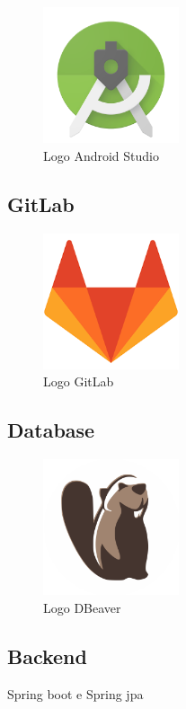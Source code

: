 \begin{figure}[htbp]	
	\centering
	\includegraphics[width=4cm]{immagini/logoandroidstudio.png}
	\caption{Logo Android Studio}
	\label{fig:Logo Android Studio}
\end{figure}

\subsection{GitLab}

\begin{figure}[htbp]	
	\centering
	\includegraphics[width=4cm]{immagini/logogitlab.png}
	\caption{Logo GitLab}
	\label{fig:Logo GitLab}
\end{figure}

\subsection{Database}

\begin{figure}[htbp]	
	\centering
	\includegraphics[width=4cm]{immagini/logodbeaver.png}
	\caption{Logo DBeaver}
	\label{fig:Logo DBeaver}
\end{figure}

\subsection{Backend}
Spring boot e Spring jpa

